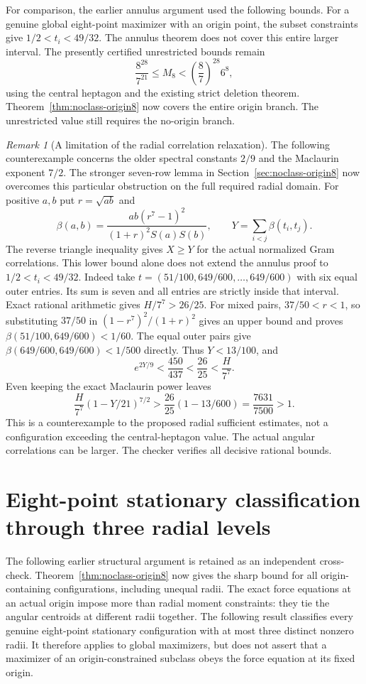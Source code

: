 \documentclass[11pt]{article}
\theoremstyle{remark}
\newtheorem{remark}[theorem]{Remark}
\numberwithin{equation}{section}
\begin{document}
For comparison, the earlier annulus argument used the following bounds.
For a genuine global eight-point maximizer with an origin point,
the subset constraints give $1/2<t_i<49/32$. The annulus theorem
does not cover this entire larger interval. The presently certified
unrestricted bounds remain
\[
\frac{8^{28}}{7^{21}}\le M_8<\left(\frac87\right)^{28}6^8,
\]
using the central heptagon and the existing strict deletion theorem.
Theorem~\ref{thm:noclass-origin8} now covers the entire origin branch.
The unrestricted value still requires the no-origin branch.
\begin{remark}[A limitation of the radial correlation relaxation]
The following counterexample concerns the older spectral constants
$2/9$ and the Maclaurin exponent $7/2$. The stronger seven-row
lemma in Section~\ref{sec:noclass-origin8} now overcomes this
particular obstruction on the full required radial domain.
For positive $a,b$ put $r=\sqrt{ab}$ and
\[
\beta(a,b)=\frac{ab(r^7-1)^2}{(1+r)^2S(a)S(b)},\qquad
Y=\sum_{i<j}\beta(t_i,t_j).
\]
The reverse triangle inequality gives $X\ge Y$ for the actual
normalized Gram correlations. This lower bound alone does not extend
the annulus proof to $1/2<t_i<49/32$. Indeed take
$t=(51/100,649/600,\ldots,649/600)$ with six equal outer entries.
Its sum is seven and all entries are strictly inside that interval.
Exact rational arithmetic gives $H/7^7>26/25$. For mixed pairs,
$37/50<r<1$, so substituting $37/50$ in
$(1-r^7)^2/(1+r)^2$ gives an upper bound and proves
$\beta(51/100,649/600)<1/60$.
The equal outer pairs give $\beta(649/600,649/600)<1/500$ directly.
Thus $Y<13/100$, and
\[
e^{2Y/9}<\frac{450}{437}<\frac{26}{25}<\frac H{7^7}.
\]
Even keeping the exact Maclaurin power leaves
\[
\frac H{7^7}(1-Y/21)^{7/2}
>\frac{26}{25}(1-13/600)=\frac{7631}{7500}>1.
\]
This is a counterexample to the proposed radial sufficient estimates,
not a configuration exceeding the central-heptagon value. The actual
angular correlations can be larger. The checker
 verifies all decisive rational bounds.
\end{remark}

\section{Eight-point stationary classification through three radial levels}
\label{sec:n8-two-radial-levels}

The following earlier structural argument is retained as an independent
cross-check. Theorem~\ref{thm:noclass-origin8} now gives the sharp
bound for all origin-containing configurations, including unequal radii.
The exact force equations at an actual origin impose more than radial
moment constraints: they tie the angular centroids at different radii
together. The following result classifies every genuine eight-point
stationary configuration with at most three distinct nonzero radii.
It therefore applies to global maximizers, but does not assert that a
maximizer of an origin-constrained subclass obeys the force equation
at its fixed origin.
\end{document}
